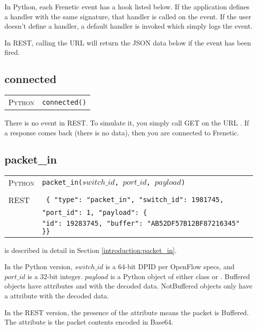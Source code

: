 In Python, each Frenetic event has a hook listed below.  If the application defines a handler with the same
signature, that handler is called on the event.  If the user doesn't define a handler, a default handler is
invoked which simply logs the event.  

In REST, calling the URL  will
return the JSON data below if the event has been fired. 

\subsection{connected}

\bigskip
\begin{tabularx}{\linewidth}{lX}
\textsc{Python}   & \texttt{connected()} \\
\end{tabularx}

There is no  event in REST.  To simulate it, you simply call GET on the URL .  If 
a response comes back (there is no data), then you are connected to Frenetic.

\subsection{packet\_in}

\bigskip
\begin{tabularx}{\linewidth}{lX}
\textsc{Python}   & \texttt{packet\_in($switch\_id$, $port\_id$, $payload$)} \\ \\
\textsc{REST} & \texttt{ \{ "type": "packet\_in", "switch\_id": 1981745, } \\
  & \texttt{"port\_id": 1, "payload": \{ } \\
  & \texttt{"id": 19283745, "buffer": "AB52DF57B12BF87216345" \}\} }
\end{tabularx}

 is described in detail in Section \ref{introduction:packet_in}.  

In the Python version, $switch\_id$ is a 64-bit DPID per OpenFlow specs,  and $port\_id$ is a 32-bit 
integer.  $payload$ is a Python object of either class  or .  
Buffered objects have attributes  and with the decoded data. 
NotBuffered objects only have a  attribute with the decoded data.    

In the REST version,
the presence of the  attribute means the packet is Buffered.  The  attribute
is the packet contents encoded in Base64.  

